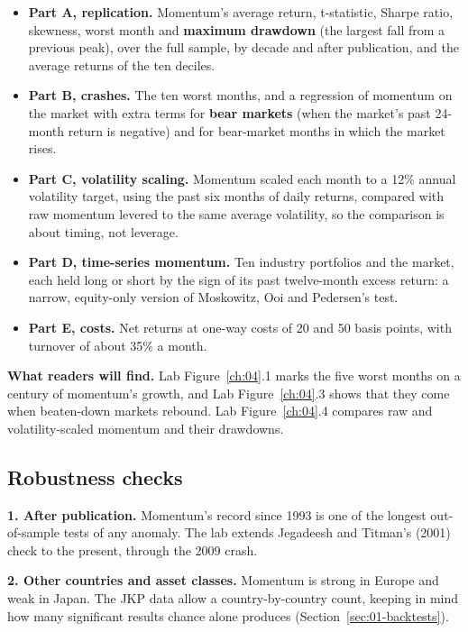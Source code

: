 \begin{itemize}
  \item \textbf{Part A, replication.} Momentum's average return, t-statistic, Sharpe ratio, skewness, worst month and \textbf{maximum drawdown} (the largest fall from a previous peak), over the full sample, by decade and after publication, and the average returns of the ten deciles.
  \item \textbf{Part B, crashes.} The ten worst months, and a regression of momentum on the market with extra terms for \textbf{bear markets} (when the market's past 24-month return is negative) and for bear-market months in which the market rises.
  \item \textbf{Part C, volatility scaling.} Momentum scaled each month to a 12\% annual volatility target, using the past six months of daily returns, compared with raw momentum levered to the same average volatility, so the comparison is about timing, not leverage.
  \item \textbf{Part D, time-series momentum.} Ten industry portfolios and the market, each held long or short by the sign of its past twelve-month excess return: a narrow, equity-only version of Moskowitz, Ooi and Pedersen's test.
  \item \textbf{Part E, costs.} Net returns at one-way costs of 20 and 50 basis points, with turnover of about 35\% a month.
\end{itemize}

\textbf{What readers will find.} Lab Figure~\ref{ch:04}.1 marks the five worst months on a century of momentum's growth, and Lab Figure~\ref{ch:04}.3 shows that they come when beaten-down markets rebound. Lab Figure~\ref{ch:04}.4 compares raw and volatility-scaled momentum and their drawdowns.

\subsection{Robustness checks}
\label{sec:05-stress}

\textbf{1. After publication.} Momentum's record since 1993 is one of the longest out-of-sample tests of any anomaly. The lab extends Jegadeesh and Titman's (2001) check to the present, through the 2009 crash.

\textbf{2. Other countries and asset classes.} Momentum is strong in Europe and weak in Japan. The JKP data allow a country-by-country count, keeping in mind how many significant results chance alone produces (Section~\ref{sec:01-backtests}).

